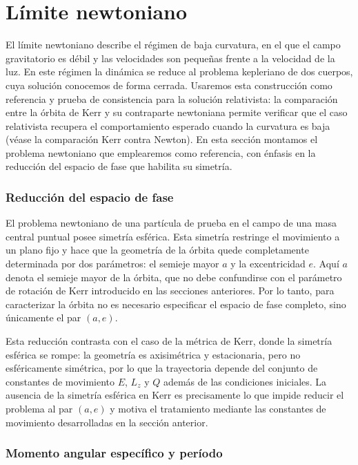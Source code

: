 \section{Límite newtoniano}

El límite newtoniano describe el régimen de baja curvatura, en el que el campo gravitatorio es débil y las velocidades son pequeñas frente a la velocidad de la luz. En este régimen la dinámica se reduce al problema kepleriano de dos cuerpos, cuya solución conocemos de forma cerrada. Usaremos esta construcción como referencia y prueba de consistencia para la solución relativista: la comparación entre la órbita de Kerr y su contraparte newtoniana permite verificar que el caso relativista recupera el comportamiento esperado cuando la curvatura es baja (véase la comparación Kerr contra Newton). En esta sección montamos el problema newtoniano que emplearemos como referencia, con énfasis en la reducción del espacio de fase que habilita su simetría.

\subsubsection{Reducción del espacio de fase}

El problema newtoniano de una partícula de prueba en el campo de una masa central puntual posee simetría esférica. Esta simetría restringe el movimiento a un plano fijo y hace que la geometría de la órbita quede completamente determinada por dos parámetros: el semieje mayor $a$ y la excentricidad $e$. Aquí $a$ denota el semieje mayor de la órbita, que no debe confundirse con el parámetro de rotación de Kerr introducido en las secciones anteriores. Por lo tanto, para caracterizar la órbita no es necesario especificar el espacio de fase completo, sino únicamente el par $(a, e)$.

Esta reducción contrasta con el caso de la métrica de Kerr, donde la simetría esférica se rompe: la geometría es axisimétrica y estacionaria, pero no esféricamente simétrica, por lo que la trayectoria depende del conjunto de constantes de movimiento $E$, $L_z$ y $Q$ además de las condiciones iniciales. La ausencia de la simetría esférica en Kerr es precisamente lo que impide reducir el problema al par $(a, e)$ y motiva el tratamiento mediante las constantes de movimiento desarrolladas en la sección anterior.

\subsubsection{Momento angular específico y período}


